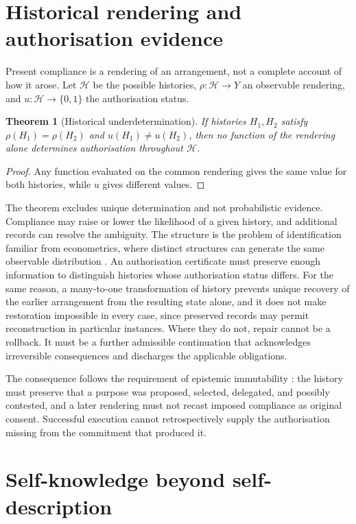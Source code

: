 \documentclass[11pt]{article}
\newtheorem{theorem}{Theorem}
\theoremstyle{definition}
\theoremstyle{remark}
\begin{document}
\section{Historical rendering and authorisation evidence}

Present compliance is a rendering of an arrangement, not a complete account of how it arose. Let $\mathcal H$ be the possible histories, $\rho:\mathcal H\to Y$ an observable rendering, and $u:\mathcal H\to\{0,1\}$ the authorisation status.

\begin{theorem}[Historical underdetermination]\label{thm:hist}
If histories $H_1,H_2$ satisfy $\rho(H_1)=\rho(H_2)$ and $u(H_1)\ne u(H_2)$, then no function of the rendering alone determines authorisation throughout $\mathcal H$.
\end{theorem}
\begin{proof}
Any function evaluated on the common rendering gives the same value for both histories, while $u$ gives different values. \qedhere
\end{proof}

The theorem excludes unique determination and not probabilistic evidence. Compliance may raise or lower the likelihood of a given history, and additional records can resolve the ambiguity. The structure is the problem of identification familiar from econometrics, where distinct structures can generate the same observable distribution \cite{koopmans1949}. An authorisation certificate must preserve enough information to distinguish histories whose authorisation status differs. For the same reason, a many-to-one transformation of history prevents unique recovery of the earlier arrangement from the resulting state alone, and it does not make restoration impossible in every case, since preserved records may permit reconstruction in particular instances. Where they do not, repair cannot be a rollback. It must be a further admissible continuation that acknowledges irreversible consequences and discharges the applicable obligations.

The consequence follows the requirement of epistemic immutability \cite{flyxionEI,flyxionLayer}: the history must preserve that a purpose was proposed, selected, delegated, and possibly contested, and a later rendering must not recast imposed compliance as original consent. Successful execution cannot retrospectively supply the authorisation missing from the commitment that produced it.

\section{Self-knowledge beyond self-description}\label{sec:self}
\end{document}
